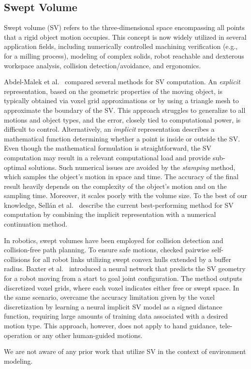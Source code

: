 \subsection{Swept Volume}
Swept volume (SV) refers to the three-dimensional space encompassing all points that a rigid object motion occupies.
This concept is now widely utilized in several application fields,
including numerically controlled machining verification (e.g., for a milling process), 
modeling of complex solids, 
robot reachable and dexterous workspace analysis, 
collision detection/avoidance, 
and ergonomics.

Abdel-Malek et al.~\cite{abdel2006swept} compared several methods for SV computation.
An \textit{explicit} representation, based on the geometric properties of the moving object, 
is typically obtained via voxel grid approximations 
or by using a triangle mesh to approximate the boundary of the SV. 
This approach struggles to generalize to all motions and object types, 
and the error, 
closely tied to computational power, 
is difficult to control.
Alternatively,
an \textit{implicit} representation describes a mathematical function determining whether a point is inside or outside the SV.
Even though the mathematical formulation is straightforward, 
the SV computation may result in a relevant computational load and provide sub-optimal solutions.
Such numerical issues are avoided by the \textit{stamping} method, which samples the object's motion in space and time.  
The accuracy of the final result heavily depends on the complexity of the object's motion and on the sampling time. 
Moreover, 
it scales poorly with the volume size. 
To the best of our knowledge, 
Sellán et al.~\cite{sellan2021swept} describe the current best-performing method for SV computation by combining the implicit representation with a numerical continuation method.

In robotics, swept volumes have been employed for collision detection and collision-free path planning. 
To ensure safe motions,
\cite{taubig2011real} checked pairwise self-collisions for all robot links utilizing swept convex hulls extended by a buffer radius. 
Baxter et al.~\cite{baxter2020deep} introduced a neural network that predicts the SV geometry for a robot moving from a start to goal joint configuration.
The method outputs discretized voxel grids, 
where each voxel indicates either free or swept space. 
In the same scenario,
\cite{joho2024neural} overcame the accuracy limitation given by the voxel discretization 
by learning a neural implicit SV model as a signed distance function, 
requiring large amounts of training data associated with a desired motion type.
This approach, 
however, 
does not apply to hand guidance, 
tele-operation or any other human-guided motions.

We are not aware of any prior work that utilize SV in the context of environment modeling.
